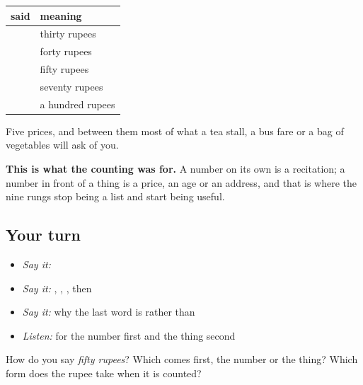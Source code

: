 \begin{grammarlens}[title={Grammar Lens: the prices you can now read}]
\noindent
\begin{tabularx}{\linewidth}{@{}>{\raggedright\arraybackslash}X>{\raggedright\arraybackslash}X@{}}
\toprule
\textbf{said} & \textbf{meaning} \\
\midrule
\hi{तीस} \hi{रुपये} & thirty rupees \\
\hi{चालीस} \hi{रुपये} & forty rupees \\
\hi{पचास} \hi{रुपये} & fifty rupees \\
\hi{सत्तर} \hi{रुपये} & seventy rupees \\
\hi{सौ} \hi{रुपये} & a hundred rupees \\
\bottomrule
\end{tabularx}

Five prices, and between them most of what a tea stall, a bus fare or a bag of vegetables will ask of you.

\textbf{This is what the counting was for.} A number on its own is a recitation; a number in front of a thing is a price, an age or an address, and that is where the nine rungs stop being a list and start being useful.
\end{grammarlens}

\subsection*{Your turn}
\begin{itemize}
\raggedright
  \item \emph{Say it:}  
  \item \emph{Say it:}  ,  ,  , then  
  \item \emph{Say it:} why the last word is  rather than 
  \item \emph{Listen:} for the number first and the thing second
\end{itemize}

\begin{tcolorbox}[breakable,colback=teal!4,colframe=teal!35!black,title={Before you move on}]
How do you say \emph{fifty rupees}? Which comes first, the number or the thing? Which form does the rupee take when it is counted?
\end{tcolorbox}
